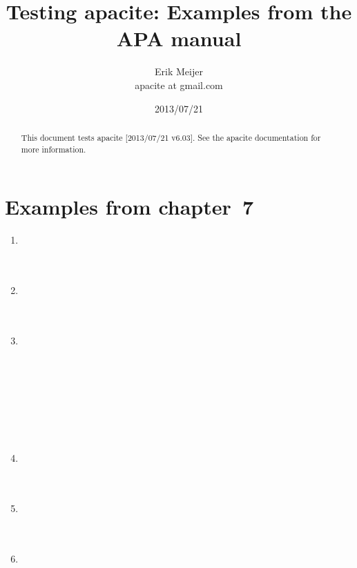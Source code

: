 \documentclass{article}
\title{Testing \textsf{apacite}: Examples from the APA manual}
\author{Erik Meijer\\
        \textsf{apacite at gmail.com}
}
\date{2013/07/21}
\begin{document}
\maketitle
\begin{abstract}
This document tests \textsf{apacite} [2013/07/21 v6.03]. See the
\textsf{apacite} documentation for more information.
\end{abstract}

\section{Examples from chapter~7}

\begin{enumerate}
\item
\cite{apa6:ch7-ex1} \\
\cite{apa6:ch7-ex1} \\
 \\

\item
\cite{apa6:ch7-ex2} \\
\cite{apa6:ch7-ex2} \\
 \\
\item
\cite{apa6:ch7-ex3-1} \\
\cite{apa6:ch7-ex3-1} \\
 \\
\\
\mbox{}\\
\cite{apa6:ch7-ex3-2} \\
\cite{apa6:ch7-ex3-2} \\
 \\
\item
\cite{apa6:ch7-ex4} \\
\cite{apa6:ch7-ex4} \\
 \\

\item
\cite{apa6:ch7-ex5} \\
\cite{apa6:ch7-ex5} \\
 \\
\item
\cite{apa6:ch7-ex6} \\
\cite{apa6:ch7-ex6} \\
 \\


\end{enumerate}
\end{document}
